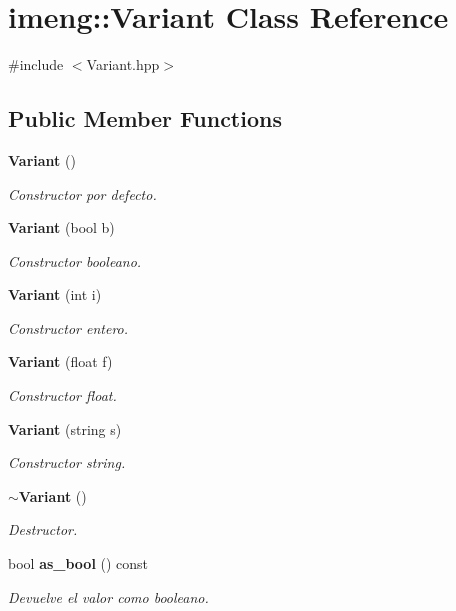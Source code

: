 \section{imeng\+::Variant Class Reference}
\label{classimeng_1_1_variant}


{\ttfamily \#include $<$Variant.\+hpp$>$}

\subsection*{Public Member Functions}
\begin{DoxyCompactItemize}
\item 
\textbf{ Variant} ()
\begin{DoxyCompactList}\small\item\em Constructor por defecto. \end{DoxyCompactList}\item 
\textbf{ Variant} (bool b)
\begin{DoxyCompactList}\small\item\em Constructor booleano. \end{DoxyCompactList}\item 
\textbf{ Variant} (int i)
\begin{DoxyCompactList}\small\item\em Constructor entero. \end{DoxyCompactList}\item 
\textbf{ Variant} (float f)
\begin{DoxyCompactList}\small\item\em Constructor float. \end{DoxyCompactList}\item 
\textbf{ Variant} (string s)
\begin{DoxyCompactList}\small\item\em Constructor string. \end{DoxyCompactList}\item 
\textbf{ $\sim$\+Variant} ()
\begin{DoxyCompactList}\small\item\em Destructor. \end{DoxyCompactList}\item 
bool \textbf{ as\+\_\+bool} () const
\begin{DoxyCompactList}\small\item\em Devuelve el valor como booleano. \end{DoxyCompactList}\item 

\end{DoxyCompactItemize}
